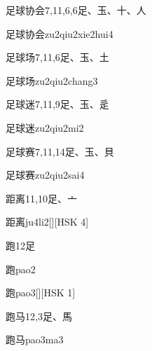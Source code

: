 \begin{entry}{足球协会}{7,11,6,6}{⾜、⽟、⼗、⼈}
  \begin{phonetics}{足球协会}{zu2qiu2xie2hui4}
  \end{phonetics}
\end{entry}

\begin{entry}{足球场}{7,11,6}{⾜、⽟、⼟}
  \begin{phonetics}{足球场}{zu2qiu2chang3}
  \end{phonetics}
\end{entry}

\begin{entry}{足球迷}{7,11,9}{⾜、⽟、⾡}
  \begin{phonetics}{足球迷}{zu2qiu2mi2}
  \end{phonetics}
\end{entry}

\begin{entry}{足球赛}{7,11,14}{⾜、⽟、⾙}
  \begin{phonetics}{足球赛}{zu2qiu2sai4}
  \end{phonetics}
\end{entry}

\begin{entry}{距离}{11,10}{⾜、⼇}
  \begin{phonetics}{距离}{ju4li2}[][HSK 4]
  \end{phonetics}
\end{entry}

\begin{entry}{跑}{12}{⾜}
  \begin{phonetics}{跑}{pao2}
  \end{phonetics}
  \begin{phonetics}{跑}{pao3}[][HSK 1]
  \end{phonetics}
\end{entry}

\begin{entry}{跑马}{12,3}{⾜、⾺}
  \begin{phonetics}{跑马}{pao3ma3}
  \end{phonetics}
\end{entry}


